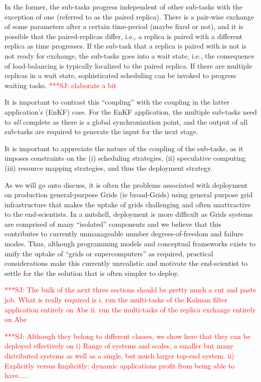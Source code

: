 \documentclass[conference,final]{IEEEtran}
\newcommand{\jhanote}[1]{ {\textcolor{red} { ***SJ: #1 }}}
\newcommand{\jhanote}[1]{}
\begin{document}
In the former, the sub-tasks
progress independent of other sub-tasks with the exception of one
(referred to as the paired replica). There is a pair-wise exchange of
some parameters after a certain time-period (maybe fixed or not), and
it is possible that the paired-replicas differ, i.e., a replica is
paired with a different replica as time progresses. If the sub-task
that a replica is paired with is not is not ready for exchange, the
sub-tasks goes into a wait state, i.e., the consequence of
load-balancing is typically localized to the paired replica. If there
are multiple replicas in a wait state, sophisticated scheduling can be
invoked to progress waiting tasks. \jhanote{elaborate a bit}

It is important to contrast this ``coupling'' with the coupling in the
latter application's (EnKF) case. For the EnKF
application, the multiple sub-tasks need to {\it all} complete
as there is a global synchronization point, and the output
of all sub-tasks are required to generate the input for the next
stage.

It is important to appreciate the nature of the coupling of the
sub-tasks, as it imposes constraints on the (i) scheduling strategies,
(ii) speculative computing (iii) resource mapping strategies, and thus
the deployment strategy.

As we will go onto discuss, it is often the problems associated with
deployment on production general-purpose Grids (ie broad-Grids) using
general purpose grid infrastructure that makes the uptake of grids
challenging and often unattractive to the end-scientists. In a
nutshell, deployment is more difficult as Grids systems are comprised
of many ``isolated'' components and we believe that this contributes
to currently unmanageable number degrees-of-freedom and failure modes.
Thus, although programming models and conceptual frameworks exists to
unify the uptake of ``grids or supercomputers'' as required, practical
considerations make this currently unrealistic and motivate the
end-scientist to settle for the the solution that is often simpler to
deploy.

\jhanote{The bulk of the next three sections should be pretty much a
  cut and paste job. What is really required is i. run the multi-tasks
  of the Kalman filter application entirely on Abe ii. run the
  multi-tasks of the replica exchange entirely on Abe}

\jhanote{Although they belong to different classes, we show here that
  they can be deployed effectively on i) Range of systems and scales,
  a smaller but many distributed systems as well as a single, but much
  larger top-end system. ii) Explicitly versus Implicitly: dynamic
  applications profit from being able to have.....}
\end{document}
